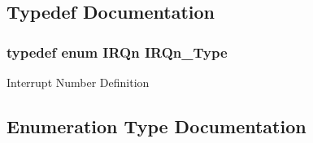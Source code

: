 \subsection{Typedef Documentation}
\hypertarget{group___s_a_m_l21_e18_a__cmsis_gac3af4a32370fb28c4ade8bf2add80251}{}
\subsubsection[{I\+R\+Qn\+\_\+\+Type}]{\setlength{\rightskip}{0pt plus 5cm}typedef enum {\bf I\+R\+Qn}  {\bf I\+R\+Qn\+\_\+\+Type}}\label{group___s_a_m_l21_e18_a__cmsis_gac3af4a32370fb28c4ade8bf2add80251}
Interrupt Number Definition 

\subsection{Enumeration Type Documentation}
\hypertarget{group___s_a_m_l21_e18_a__cmsis_ga666eb0caeb12ec0e281415592ae89083}{}
